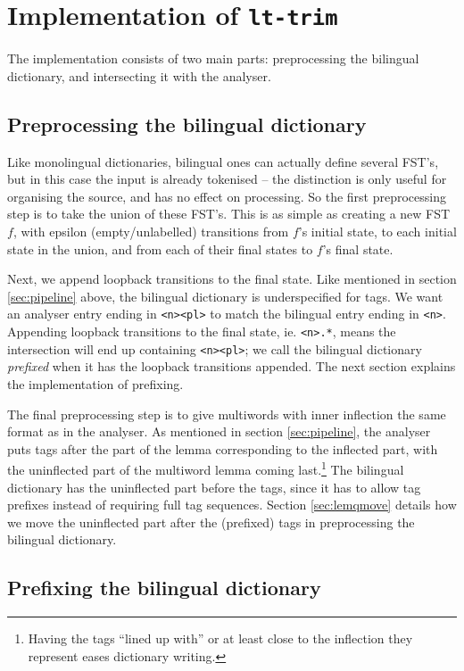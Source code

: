 \documentclass[10pt, a4paper]{article}
\newcommand{\ana}[1]{\texttt{#1}}
\newcommand{\tool}[1]{\texttt{#1}}
\begin{document}
\section{Implementation of \tool{lt-trim}}

The implementation consists of two main parts: preprocessing the
bilingual dictionary, and intersecting it with the analyser. 


\subsection{Preprocessing the bilingual dictionary}

Like monolingual dictionaries, bilingual ones can actually define
several FST's, but in this case the input is already tokenised -- the
distinction is only useful for organising the source, and has no
effect on processing. So the first preprocessing step is to take the
union of these FST's. This is as simple as creating a new FST $f$,
with epsilon (empty/unlabelled) transitions from $f$'s initial state,
to each initial state in the union, and from each of their final
states to $f$'s final state.

Next, we append loopback transitions to the final state. Like
mentioned in section \ref{sec:pipeline} above, the bilingual
dictionary is underspecified for tags. We want an analyser entry
ending in \ana{<n><pl>} to match the bilingual entry ending in
\ana{<n>}. Appending loopback transitions to the final state, ie.
\ana{<n>.*}, means the intersection will end up containing
\ana{<n><pl>}; we call the bilingual dictionary \emph{prefixed} when
it has the loopback transitions appended. The next section explains
the implementation of prefixing.

The final preprocessing step is to give multiwords with inner
inflection the same format as in the analyser. As mentioned in section
\ref{sec:pipeline}, the analyser puts tags after the part of the lemma
corresponding to the inflected part, with the uninflected part of the
multiword lemma coming last.\footnote{Having the tags ``lined up
with'' or at least close to the inflection they represent eases
dictionary writing.} The bilingual dictionary has the uninflected part
before the tags, since it has to allow tag prefixes instead of
requiring full tag sequences.  Section \ref{sec:lemqmove} details how
we move the uninflected part after the (prefixed) tags in
preprocessing the bilingual dictionary.

\subsection{Prefixing the bilingual dictionary}
\end{document}
